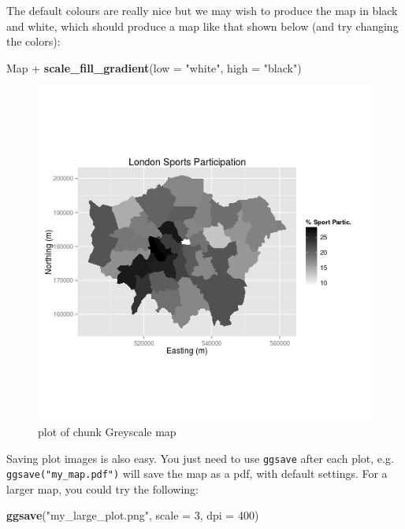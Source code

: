 \documentclass[]{article}
\newenvironment{Shaded}{}{}
\newcommand{\KeywordTok}[1]{\textcolor[rgb]{0.00,0.44,0.13}{\textbf{{#1}}}}
\newcommand{\DataTypeTok}[1]{\textcolor[rgb]{0.56,0.13,0.00}{{#1}}}
\newcommand{\DecValTok}[1]{\textcolor[rgb]{0.25,0.63,0.44}{{#1}}}
\newcommand{\StringTok}[1]{\textcolor[rgb]{0.25,0.44,0.63}{{#1}}}
\newcommand{\NormalTok}[1]{{#1}}
\begin{document}
The default colours are really nice but we may wish to produce the map
in black and white, which should produce a map like that shown below
(and try changing the colors):

\begin{Shaded}
\begin{Highlighting}[]
\NormalTok{Map +}\StringTok{ }\KeywordTok{scale_fill_gradient}\NormalTok{(}\DataTypeTok{low =} \StringTok{"white"}\NormalTok{, }\DataTypeTok{high =} \StringTok{"black"}\NormalTok{)}
\end{Highlighting}
\end{Shaded}

\begin{figure}[htbp]
\centering
\includegraphics{figure/Greyscale_map.png}
\caption{plot of chunk Greyscale map}
\end{figure}

Saving plot images is also easy. You just need to use \texttt{ggsave}
after each plot, e.g. \texttt{ggsave("my\_map.pdf")} will save the map
as a pdf, with default settings. For a larger map, you could try the
following:

\begin{Shaded}
\begin{Highlighting}[]
\KeywordTok{ggsave}\NormalTok{(}\StringTok{"my_large_plot.png"}\NormalTok{, }\DataTypeTok{scale =} \DecValTok{3}\NormalTok{, }\DataTypeTok{dpi =} \DecValTok{400}\NormalTok{)}
\end{Highlighting}
\end{Shaded}
\end{document}
